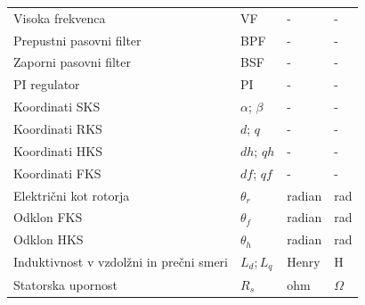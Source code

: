 \documentclass[a4paper,twoside,openright,12pt,slovene]{book}
\begin{document}
\begin{center}
\begin{tabular}{*{4}{l}}
        Visoka frekvenca                                           & VF                                     & -                    & -                      \\
        Prepustni pasovni filter                                   & BPF                                    & -                    & -                      \\
        Zaporni pasovni filter                                     & BSF                                    & -                    & -                      \\
        PI regulator                                               & PI                                     & -                    & -                      \\                                                    
        Koordinati SKS                                             & $\alpha$; $\beta$                      & -                    & -                      \\
        Koordinati RKS                                             & $d$; $q$                               & -                    & -                      \\
        Koordinati HKS                                             & $dh$; $qh$                             & -                    & -                      \\
        Koordinati FKS                                             & $df$; $qf$                             & -                    & -                      \\
        Električni kot rotorja                                     & $\theta_{r}$                           & radian               & rad                    \\
        Odklon FKS                                                 & $\theta_{f}$                           & radian               & rad                    \\
        Odklon HKS                                                 & $\theta_{h}$                           & radian               & rad                    \\
        Induktivnost v vzdolžni in prečni smeri                    & $L_d; L_q$                             & Henry                & H                      \\
        Statorska upornost                                         & $R_s$                                  & ohm                  & $\Omega$               \\

\end{tabular}
\end{center}
\end{document}
